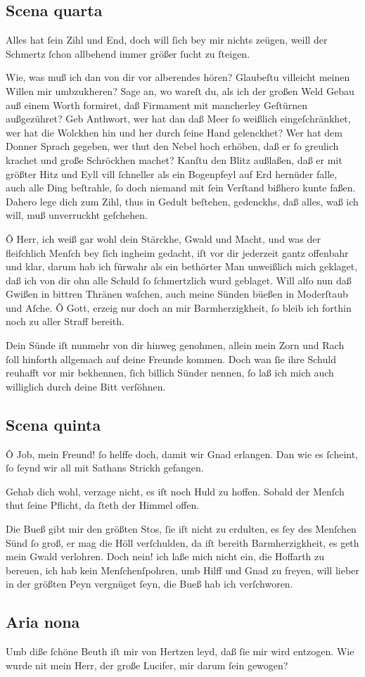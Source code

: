 \documentclass{ees}
\newenvironment{lyrics}[1]{%
  \subsection{#1}\nopagebreak%
  \begin{lyricslist}%
  \let\voice\item%
}{%
  \end{lyricslist}%
}
\begin{document}
\begin{lyrics}{Scena quarta}
  \voice[Job]
  Alles hat ſein Zihl und End,
  doch will ſich bey mir nichts zeügen,
  weill der Schmertz ſchon allbehend
  immer größer ſucht zu ſteigen.

  \voice[Schöpffer]
  Wie, was muß ich dan von dir
  vor alberendes hören?
  Glaubeſtu villeicht
  meinen Willen mir umbzukheren?
  Sage an, wo wareſt du,
  als ich der großen Weld Gebau
  auß einem Worth formiret,
  daß Firmament mit mancherley Geſtürnen außgezühret?
  Geb Anthwort, wer hat dan daß Meer
  ſo weißlich eingeſchränkhet,
  wer hat die Wolckhen hin und her
  durch ſeine Hand gelenckhet?
  Wer hat dem Donner Sprach gegeben,
  wer thut den Nebel hoch erhöben,
  daß er ſo greulich krachet
  und große Schröckhen machet?
  Kanſtu den Blitz außlaßen,
  daß er mit größter Hitz und Eyll
  vill ſchneller als ein Bogenpfeyl
  auf Erd hernüder falle,
  auch alle Ding beſtrahle,
  ſo doch niemand mit ſein Verſtand
  bißhero kunte faßen.
  Dahero lege dich zum Zihl,
  thus in Gedult beſtehen,
  gedenckhs, daß alles, waß ich will,
  muß unverruckht geſchehen.

  \voice[Job]
  Ô Herr, ich weiß gar wohl
  dein Stärckhe, Gwald und Macht,
  und was der fleiſchlich Menſch
  bey ſich ingheim gedacht,
  iſt vor dir jederzeit
  gantz offenbahr und klar,
  darum hab ich fürwahr
  als ein bethörter Man
  unweißlich mich geklaget,
  daß ich von dir ohn alle Schuld
  ſo ſchmertzlich wurd geblaget.
  Will alſo nun daß Gwißen
  in bittren Thränen waſchen,
  auch meine Sünden büeßen
  in Moderſtaub und Aſche.
  Ô Gott, erzeig
  nur doch an mir Barmherzigkheit,
  ſo bleib ich forthin noch
  zu aller Straff bereith.

  \voice[Schöpffer]
  Dein Sünde iſt nunmehr
  von dir hinweg genohmen,
  allein mein Zorn und Rach
  ſoll hinforth allgemach
  auf deine Freunde kommen.
  Doch wan ſie ihre Schuld
  reuhafft vor mir bekhennen,
  ſich billich Sünder nennen,
  ſo laß ich mich
  auch williglich
  durch deine Bitt verſöhnen.
\end{lyrics}

\begin{lyrics}{Scena quinta}
  \voice[Eliphas]
  Ô Job, mein Freund! ſo helffe doch,
  damit wir Gnad erlangen.
  Dan wie es ſcheint, ſo ſeynd wir all
  mit Sathans Strickh gefangen.

  \voice[Job]
  Gehab dich wohl, verzage nicht,
  es iſt noch Huld zu hoffen.
  Sobald der Menſch thut ſeine Pflicht,
  da ſteth der Himmel offen.

  \voice[Leviathan]
  Die Bueß gibt mir den größten Stos,
  ſie iſt nicht zu erdulten,
  es ſey des Menſchen Sünd ſo groß,
  er mag die Höll verſchulden,
  da iſt bereith Barmherzigkheit,
  es geth mein Gwald verlohren.
  Doch nein!
  ich laße mich nicht ein,
  die Hoffarth zu bereuen,
  ich hab kein Menſchenſpohren,
  umb Hilff und Gnad zu freyen,
  will lieber in der größten Peyn
  vergnüget ſeyn,
  die Bueß hab ich verſchworen.
\end{lyrics}

\begin{lyrics}{Aria nona}
  \voice[Leviathan]
  Umb diße ſchöne Beuth
  iſt mir von Hertzen leyd,
  daß ſie mir wird entzogen.
  Wie wurde nit mein Herr,
  der große Lucifer,
  mir darum ſein gewogen?
\end{lyrics}

\end{document}
